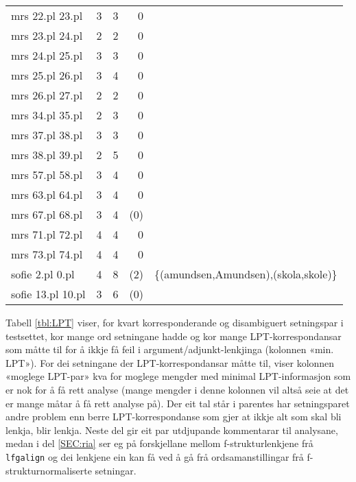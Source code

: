 \documentclass[11pt,a4paper,oneside,draft]{report}
\begin{document}
\begin{table}[htb]
\begin{center}
\begin{tabular}{lrrrl}
 mrs 22.pl 23.pl    &      3  &      3  &         0  &                                                \\
 mrs 23.pl 24.pl    &      2  &      2  &         0  &                                                \\
 mrs 24.pl 25.pl    &      3  &      3  &         0  &                                                \\
 mrs 25.pl 26.pl    &      3  &      4  &         0  &                                                \\
 mrs 26.pl 27.pl    &      2  &      2  &         0  &                                                \\
 mrs 34.pl 35.pl    &      2  &      3  &         0  &                                                \\
 mrs 37.pl 38.pl    &      3  &      3  &         0  &                                                \\
 mrs 38.pl 39.pl    &      2  &      5  &         0  &                                                \\
 mrs 57.pl 58.pl    &      3  &      4  &         0  &                                                \\
 mrs 63.pl 64.pl    &      3  &      4  &         0  &                                                \\
 mrs 67.pl 68.pl    &      3  &      4  &       (0)  &                                                \\
 mrs 71.pl 72.pl    &      4  &      4  &         0  &                                                \\
 mrs 73.pl 74.pl    &      4  &      4  &         0  &                                                \\
 sofie 2.pl 0.pl    &      4  &      8  &       (2)  &  \{(amundsen,Amundsen),(skola,skole)\}         \\
 sofie 13.pl 10.pl  &      3  &      6  &       (0)  &                                                \\
\end{tabular}
\end{center}
\end{table}


Tabell \ref{tbl:LPT} viser, for kvart korresponderande og disambiguert
setningspar i testsettet, kor mange ord setningane hadde og kor mange
LPT-korrespondansar som måtte til for å ikkje få feil i
argument/adjunkt-lenkjinga (kolonnen «min. LPT»). For dei setningane
der LPT-korrespondansar måtte til, viser kolonnen «moglege LPT-par»
kva for moglege mengder med minimal LPT-informasjon som er nok for å
få rett analyse (mange mengder i denne kolonnen vil altså seie at det
er mange måtar å få rett analyse på).  Der eit tal står i parentes har
setningsparet andre problem enn berre LPT-korrespondanse som gjer at
ikkje alt som skal bli lenkja, blir lenkja. Neste del gir eit par
utdjupande kommentarar til analysane, medan i del \ref{SEC:ria} ser eg
på forskjellane mellom f-strukturlenkjene frå \texttt{lfgalign} og dei
lenkjene ein kan få ved å gå frå ordsamanstillingar frå
f-strukturnormaliserte setningar.
\end{document}
